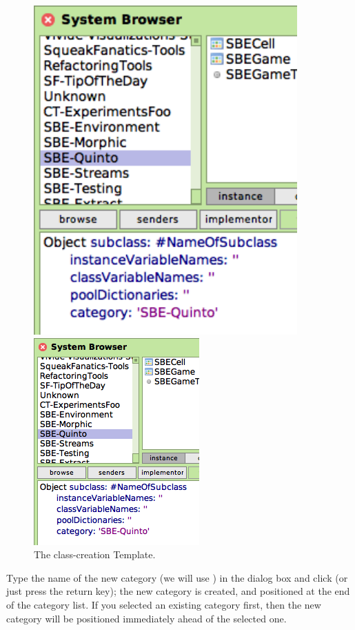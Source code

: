 \documentclass[a4paper,10pt,twoside]{book}
\begin{document}
\begin{figure}[htb]
\begin{minipage}[b]{0.48\textwidth}
	{\centerline {\includegraphics[width=0.9\textwidth]{ClassTemplate}}}
	{\centerline {\includegraphics[scale=0.7]{ClassTemplate}}}
	\caption{The class-creation Template.
	\label{fig:classTemplate}}
\end{minipage}
\end{figure}

Type the name of the new category (we will use ) in the dialog box and click  (or just press the return key); the new category is created, and positioned at the end of the category list.
If you selected an existing category first, then the new category will be positioned immediately ahead of the selected one.
\end{document}
